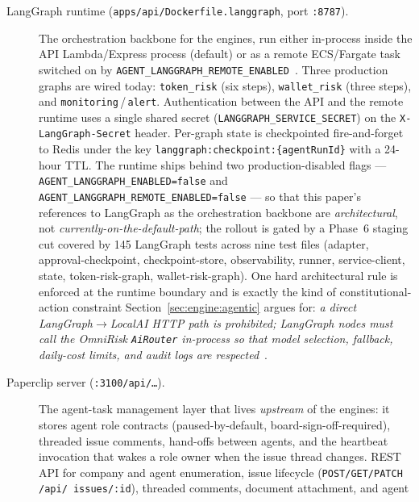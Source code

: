 \documentclass[11pt,a4paper]{article}
\begin{document}
\begin{description}
  \item[LangGraph runtime
        (\texttt{apps/api/Dockerfile.langgraph}, port \texttt{:8787}).]
        The orchestration backbone for the engines, run either in-process
        inside the API Lambda/Express process (default) or as a remote
        ECS/Fargate task switched on by
        \texttt{AGENT\_LANGGRAPH\_REMOTE\_ENABLED}~\cite{omnirisk2026agentic}.
        Three production graphs are wired today: \texttt{token\_risk}
        (six steps), \texttt{wallet\_risk} (three steps), and
        \texttt{monitoring}\,/\,\texttt{alert}. Authentication between the
        API and the remote runtime uses a single shared secret
        (\texttt{LANGGRAPH\_SERVICE\_SECRET}) on the \texttt{X-LangGraph-Secret}
        header. Per-graph state is checkpointed fire-and-forget to Redis
        under the key \texttt{langgraph:checkpoint:\{agentRunId\}} with a
        24-hour TTL. The runtime ships behind two production-disabled
        flags --- \texttt{AGENT\_LANGGRAPH\_ENABLED=false} and
        \texttt{AGENT\_LANGGRAPH\_REMOTE\_ENABLED=false} --- so that this
        paper's references to LangGraph as the orchestration backbone are
        \emph{architectural}, not \emph{currently-on-the-default-path}; the
        rollout is gated by a Phase~6 staging cut covered by 145 LangGraph
        tests across nine test files (adapter, approval-checkpoint,
        checkpoint-store, observability, runner, service-client, state,
        token-risk-graph, wallet-risk-graph). One hard architectural rule
        is enforced at the runtime boundary and is exactly the kind of
        constitutional-action constraint Section~\ref{sec:engine:agentic}
        argues for: \emph{a direct LangGraph$\to$LocalAI HTTP path is
        prohibited; LangGraph nodes must call the OmniRisk
        \texttt{AiRouter} in-process so that model selection, fallback,
        daily-cost limits, and audit logs are
        respected}~\cite{omnirisk2026agentic}.
  \item[Paperclip server (\texttt{:3100/api/\dots}).]
        The agent-task management layer that lives \emph{upstream} of the
        engines: it stores agent role contracts (paused-by-default,
        board-sign-off-required), threaded issue comments, hand-offs
        between agents, and the heartbeat invocation that wakes a role
        owner when the issue thread changes. REST API for company and
        agent enumeration, issue lifecycle (\texttt{POST/GET/PATCH /api/
        issues/:id}), threaded comments, document attachment, and agent

\end{description}
\end{document}

